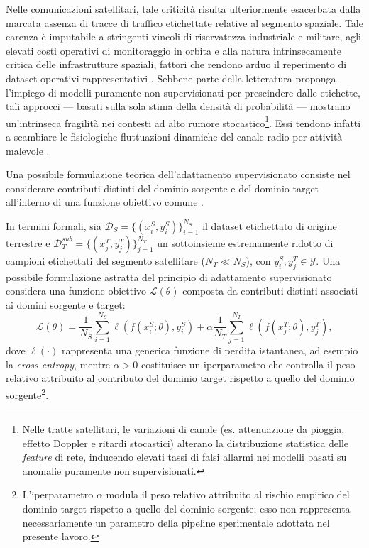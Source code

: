 Nelle comunicazioni satellitari, tale criticità risulta ulteriormente esacerbata dalla marcata assenza di tracce di traffico etichettate relative al segmento spaziale. 
Tale carenza è imputabile a stringenti vincoli di riservatezza industriale e militare, agli elevati costi operativi di monitoraggio in orbita e alla natura intrinsecamente critica delle infrastrutture spaziali, fattori che rendono arduo il reperimento di dataset operativi rappresentativi \cite{kodheli2021, azar2023}. 
Sebbene parte della letteratura proponga l'impiego di modelli puramente non supervisionati per prescindere dalle etichette, tali approcci — basati sulla sola stima della densità di probabilità — mostrano un'intrinseca fragilità nei contesti ad alto rumore stocastico\footnote{Nelle tratte satellitari, le variazioni di canale (es. attenuazione da pioggia, effetto Doppler e ritardi stocastici) alterano la distribuzione statistica delle \textit{feature} di rete, inducendo elevati tassi di falsi allarmi nei modelli basati su anomalie puramente non supervisionati.}. 
Essi tendono infatti a scambiare le fisiologiche fluttuazioni dinamiche del canale radio per attività malevole \cite{nist2022, khraisat2019}.

Una possibile formulazione teorica dell'adattamento supervisionato consiste nel considerare contributi distinti del dominio sorgente e del dominio target all'interno di una funzione obiettivo comune \cite{daume2009, motiian2017}.

In termini formali, sia $\mathcal{D}_S = \{(x_i^S, y_i^S)\}_{i=1}^{N_S}$ il dataset etichettato di origine terrestre e $\mathcal{D}_T^{sub} = \{(x_j^T, y_j^T)\}_{j=1}^{N_T}$ un sottoinsieme estremamente ridotto di campioni etichettati del segmento satellitare ($N_T \ll N_S$), con $y_i^S, y_j^T \in \mathcal{Y}$.
Una possibile formulazione astratta del principio di adattamento supervisionato considera una funzione obiettivo $\mathcal{L}(\theta)$ composta da contributi distinti associati ai domini sorgente e target:
\begin{equation}
\mathcal{L}(\theta) =
\frac{1}{N_S}
\sum_{i=1}^{N_S}
\ell\left(f(x_i^S;\theta),y_i^S\right)
+
\alpha
\frac{1}{N_T}
\sum_{j=1}^{N_T}
\ell\left(f(x_j^T;\theta),y_j^T\right),
\label{eq:supervised_da_loss}
\end{equation}
dove $\ell(\cdot)$ rappresenta una generica funzione di perdita istantanea, ad esempio la \textit{cross-entropy}, mentre $\alpha>0$ costituisce un iperparametro che controlla il peso relativo attribuito al contributo del dominio target rispetto a quello del dominio sorgente\footnote{L'iperparametro $\alpha$ modula il peso relativo attribuito al rischio empirico del dominio target rispetto a quello del dominio sorgente; esso non rappresenta necessariamente un parametro della pipeline sperimentale adottata nel presente lavoro.}.

